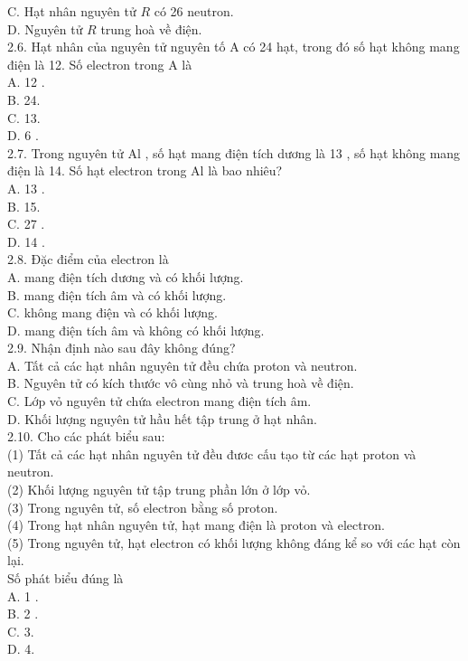 \documentclass[10pt]{article}
\begin{document}
C. Hạt nhân nguyên tử $R$ có 26 neutron.\\
D. Nguyên tử $R$ trung hoà về điện.\\
2.6. Hạt nhân của nguyên tử nguyên tố A có 24 hạt, trong đó số hạt không mang điện là 12. Số electron trong A là\\
A. 12 .\\
B. 24.\\
C. 13.\\
D. 6 .\\
2.7. Trong nguyên tử Al , số hạt mang điện tích dương là 13 , số hạt không mang điện là 14. Số hạt electron trong Al là bao nhiêu?\\
A. 13 .\\
B. 15.\\
C. 27 .\\
D. 14 .\\
2.8. Đặc điểm của electron là\\
A. mang điện tích dương và có khối lượng.\\
B. mang điện tích âm và có khối lượng.\\
C. không mang điện và có khối lượng.\\
D. mang điện tích âm và không có khối lượng.\\
2.9. Nhận định nào sau đây không đúng?\\
A. Tất cả các hạt nhân nguyên tử đều chứa proton và neutron.\\
B. Nguyên tử có kích thước vô cùng nhỏ và trung hoà về điện.\\
C. Lớp vỏ nguyên tử chứa electron mang điện tích âm.\\
D. Khối lượng nguyên tử hầu hết tập trung ở hạt nhân.\\
2.10. Cho các phát biểu sau:\\
(1) Tất cả các hạt nhân nguyên tử đều đươc cấu tạo từ các hạt proton và neutron.\\
(2) Khối lượng nguyên tử tập trung phần lớn ở lớp vỏ.\\
(3) Trong nguyên tử, số electron bằng số proton.\\
(4) Trong hạt nhân nguyên tử, hạt mang điện là proton và electron.\\
(5) Trong nguyên tử, hạt electron có khối lượng không đáng kể so với các hạt còn lại.\\
Số phát biểu đúng là\\
A. 1 .\\
B. 2 .\\
C. 3.\\
D. 4.\\
\end{document}
